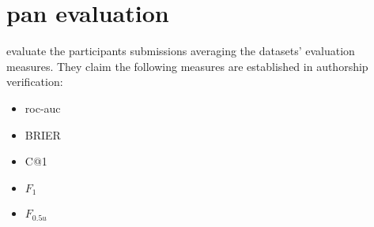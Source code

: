 \section{\acs{pan} evaluation}
\label{sec:pan_evaluation}

\citet{ayele_overview_2024} evaluate the participants submissions averaging the datasets' evaluation measures.
They claim the following measures are established in authorship verification:
\begin{itemize}
    \item \ac{roc-auc}
    \item BRIER
    \item C@1
    \item $F_1$
    \item $F_{0.5u}$
\end{itemize}